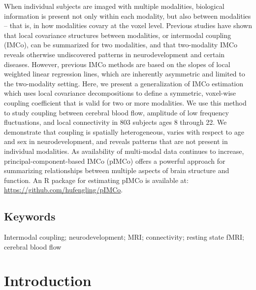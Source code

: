 \documentclass[
  12pt,
]{article}
\begin{document}
When individual subjects are imaged with multiple modalities, biological information is present not only within each modality, but also between modalities -- that is, in how modalities covary at the voxel level. Previous studies have shown that local covariance structures between modalities, or intermodal coupling (IMCo), can be summarized for two modalities, and that two-modality IMCo reveals otherwise undiscovered patterns in neurodevelopment and certain diseases. However, previous IMCo methods are based on the slopes of local weighted linear regression lines, which are inherently asymmetric and limited to the two-modality setting. Here, we present a generalization of IMCo estimation which uses local covariance decompositions to define a symmetric, voxel-wise coupling coefficient that is valid for two or more modalities. We use this method to study coupling between cerebral blood flow, amplitude of low frequency fluctuations, and local connectivity in 803 subjects ages 8 through 22. We demonstrate that coupling is spatially heterogeneous, varies with respect to age and sex in neurodevelopment, and reveals patterns that are not present in individual modalities. As availability of multi-modal data continues to increase, principal-component-based IMCo (pIMCo) offers a powerful approach for summarizing relationships between multiple aspects of brain structure and function. An R package for estimating pIMCo is available at: \url{https://github.com/hufengling/pIMCo}.

\hypertarget{keywords}{%
\subsection*{Keywords}\label{keywords}}

Intermodal coupling; neurodevelopment; MRI; connectivity; resting state fMRI; cerebral blood flow

\newpage

\hypertarget{introduction}{%
\section{Introduction}\label{introduction}}
\end{document}
